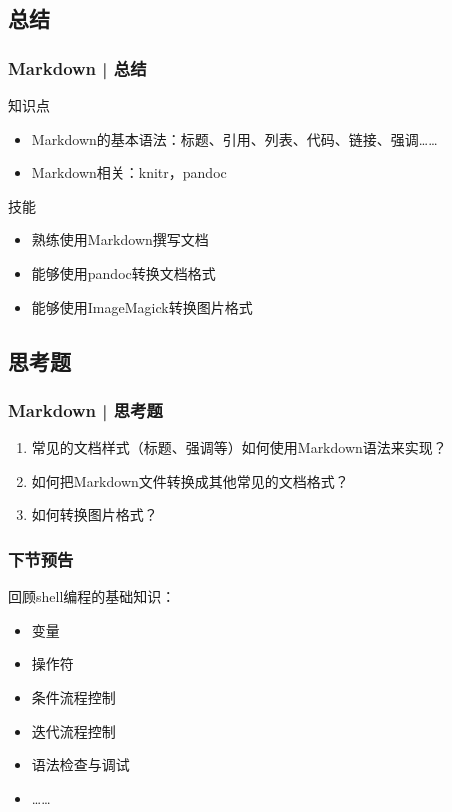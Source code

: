 \subsection{总结}
\begin{frame}
  \frametitle{Markdown | 总结}
  \begin{block}{知识点}
    \begin{itemize}
      \item Markdown的基本语法：标题、引用、列表、代码、链接、强调……
      \item Markdown相关：knitr，pandoc
    \end{itemize}
  \end{block}
  \begin{block}{技能}
    \begin{itemize}
      \item 熟练使用Markdown撰写文档
      \item 能够使用pandoc转换文档格式
      \item 能够使用ImageMagick转换图片格式
    \end{itemize}
  \end{block}
\end{frame}

\subsection{思考题}
\begin{frame}
  \frametitle{Markdown | 思考题}
  \begin{enumerate}
    \item 常见的文档样式（标题、强调等）如何使用Markdown语法来实现？
    \item 如何把Markdown文件转换成其他常见的文档格式？
    \item 如何转换图片格式？
  \end{enumerate}
\end{frame}

\begin{frame}
  \frametitle{下节预告}
  回顾shell编程的基础知识：
  \begin{itemize}
    \item 变量
    \item 操作符
    \item 条件流程控制
    \item 迭代流程控制
    \item 语法检查与调试
    \item ……
  \end{itemize}
\end{frame}



